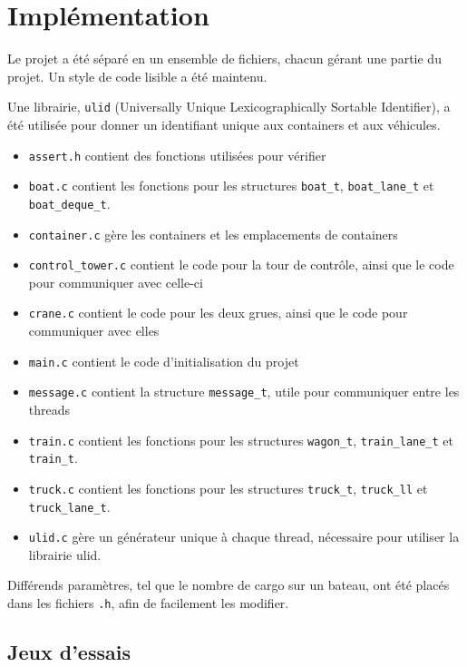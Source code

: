 \documentclass[12pt]{article}
\begin{document}
\section{Implémentation}

Le projet a été séparé en un ensemble de fichiers, chacun gérant une partie du projet.
Un style de code lisible a été maintenu.

Une librairie, \texttt{ulid} (Universally Unique Lexicographically Sortable Identifier), a été utilisée pour donner un identifiant unique aux containers et aux véhicules.

\begin{itemize}
    \item \texttt{assert.h} contient des fonctions utilisées pour vérifier
    \item \texttt{boat.c} contient les fonctions pour les structures \texttt{boat\_t}, \texttt{boat\_lane\_t} et \texttt{boat\_deque\_t}.
    \item \texttt{container.c} gère les containers et les emplacements de containers
    \item \texttt{control\_tower.c} contient le code pour la tour de contrôle, ainsi que le code pour communiquer avec celle-ci
    \item \texttt{crane.c} contient le code pour les deux grues, ainsi que le code pour communiquer avec elles
    \item \texttt{main.c} contient le code d'initialisation du projet
    \item \texttt{message.c} contient la structure \texttt{message\_t}, utile pour communiquer entre les threads
    \item \texttt{train.c} contient les fonctions pour les structures \texttt{wagon\_t}, \texttt{train\_lane\_t} et \texttt{train\_t}.
    \item \texttt{truck.c} contient les fonctions pour les structures \texttt{truck\_t}, \texttt{truck\_ll} et \texttt{truck\_lane\_t}.
    \item \texttt{ulid.c} gère un générateur unique à chaque thread, nécessaire pour utiliser la librairie ulid.
\end{itemize}

Différends paramètres, tel que le nombre de cargo sur un bateau, ont été placés dans les fichiers \texttt{.h}, afin de facilement les modifier.

\subsection{Jeux d'essais}
\end{document}

